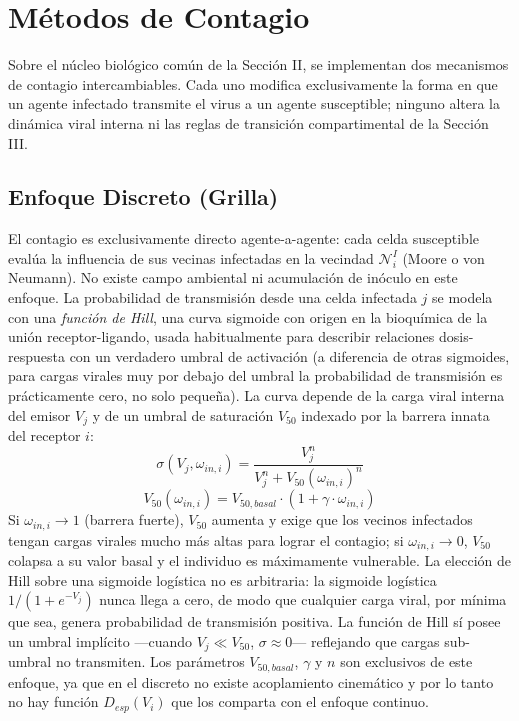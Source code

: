 \documentclass[conference]{IEEEtran}
\begin{document}
\section{Métodos de Contagio}
Sobre el núcleo biológico común de la Sección II, se implementan dos mecanismos de contagio intercambiables. Cada uno modifica exclusivamente la forma en que un agente infectado transmite el virus a un agente susceptible; ninguno altera la dinámica viral interna ni las reglas de transición compartimental de la Sección III.

\subsection{Enfoque Discreto (Grilla)}
El contagio es exclusivamente directo agente-a-agente: cada celda susceptible evalúa la influencia de sus vecinas infectadas en la vecindad $\mathcal{N}_i^I$ (Moore o von Neumann). No existe campo ambiental ni acumulación de inóculo en este enfoque. La probabilidad de transmisión desde una celda infectada $j$ se modela con una \emph{función de Hill}, una curva sigmoide con origen en la bioquímica de la unión receptor-ligando, usada habitualmente para describir relaciones dosis-respuesta con un verdadero umbral de activación (a diferencia de otras sigmoides, para cargas virales muy por debajo del umbral la probabilidad de transmisión es prácticamente cero, no solo pequeña). La curva depende de la carga viral interna del emisor $V_j$ y de un umbral de saturación $V_{50}$ indexado por la barrera innata del receptor $i$:
\begin{equation}
\sigma(V_j, \omega_{in,i}) = \frac{V_j^n}{V_j^n + V_{50}(\omega_{in,i})^n}
\end{equation}
\begin{equation}
V_{50}(\omega_{in,i}) = V_{50,basal} \cdot (1 + \gamma \cdot \omega_{in,i})
\end{equation}
Si $\omega_{in,i}\to 1$ (barrera fuerte), $V_{50}$ aumenta y exige que los vecinos infectados tengan cargas virales mucho más altas para lograr el contagio; si $\omega_{in,i}\to 0$, $V_{50}$ colapsa a su valor basal y el individuo es máximamente vulnerable. La elección de Hill sobre una sigmoide logística no es arbitraria: la sigmoide logística $1/(1+e^{-V_j})$ nunca llega a cero, de modo que cualquier carga viral, por mínima que sea, genera probabilidad de transmisión positiva. La función de Hill sí posee un umbral implícito ---cuando $V_j \ll V_{50}$, $\sigma \approx 0$--- reflejando que cargas sub-umbral no transmiten. Los parámetros $V_{50,basal}$, $\gamma$ y $n$ son exclusivos de este enfoque, ya que en el discreto no existe acoplamiento cinemático y por lo tanto no hay función $D_{esp}(V_i)$ que los comparta con el enfoque continuo.
\end{document}
